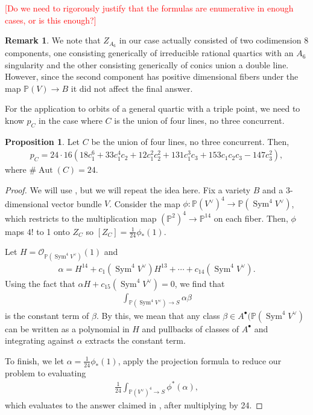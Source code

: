 \documentclass{article}
\newcommand{\rood}[1]{\textcolor{red}{[#1]}}
\theoremstyle{definition}
\newtheorem{prop}[thm]{Proposition}
\newtheorem{rmk}[thm]{Remark}
\newcommand{\on}{\operatorname}
\newcommand{\mb}{\mathbb}
\newcommand{\ms}{\mathscr}
\begin{document}
\rood{Do we need to rigorously justify that the formulas are enumerative in enough cases, or is this enough?}

\begin{rmk}
We note that $Z_{A_6}$ in our case actually consisted of two codimension 8 components, one consisting generically of irreducible rational quartics with an $A_6$ singularity and the other consisting generically of conics union a double line. However, since the second component has positive dimensional fibers under the map $\mb{P}(V)\to B$ it did not affect the final answer. 
\end{rmk}

For the application to orbits of a general quartic with a triple point, we need to know $p_C$ in the case where $C$ is the union of four lines, no three concurrent.

\begin{prop}
\label{fourlines}
Let $C$ be the union of four lines, no three concurrent. Then, 
\begin{align*}
    p_C = 24\cdot 16 (18 c_1^6 + 33 c_1^4 c_2 + 12 c_1^2 c_2^2 + 131 c_1^3 c_3 + 
   153 c_1 c_2 c_3 - 147 c_3^2),
\end{align*}
where $\#\on{Aut}(C)=24$.
\end{prop}

\begin{proof}
We will use \cite[Theorem 3.1]{FNR06}, but we will repeat the idea here. Fix a variety $B$ and a 3-dimensional vector bundle $V$. Consider the map $\phi: \mb{P}(V^{\vee})^4\to \mb{P}(\on{Sym}^4V^{\vee})$, which restricts to the multiplication map $(\mb{P}^2)^4\to \mb{P}^14$ on each fiber. Then, $\phi$ maps $4!$ to 1 onto $Z_C$ so $[Z_C]=\frac{1}{24}\phi_{*}(1)$.  

Let $H=\ms{O}_{\mb{P}(\on{Sym}^4V^{\vee})}(1)$ and 
\begin{align*}
    \alpha = H^{14}+c_1(\on{Sym}^4V^{\vee})H^{13}+\cdots+c_{14}(\on{Sym}^4V^{\vee}). 
\end{align*}
Using the fact that $\alpha H + c_{15}(\on{Sym}^4V^{\vee})=0$, we find that
\begin{align*}
    \int_{\mb{P}(\on{Sym}^4V^{\vee})\to S}\alpha\beta
\end{align*}
is the constant term of $\beta$. By this, we mean that any class $\beta\in A^{\bullet}(\mb{P}(\on{Sym}^4V^{\vee})$ can be written as a polynomial in $H$ and pullbacks of classes of $A^{\bullet}$ and integrating against $\alpha$ extracts the constant term. 

To finish, we let $\alpha=\frac{1}{24}\phi_{*}(1)$, apply the projection formula to reduce our problem to evaluating
\begin{align*}
    \frac{1}{24}\int_{\mb{P}(V^{\vee})^4\to S}\phi^{*}(\alpha),
\end{align*}
which evaluates to the answer claimed in , after multiplying by 24. 
\end{proof}
\end{document}
